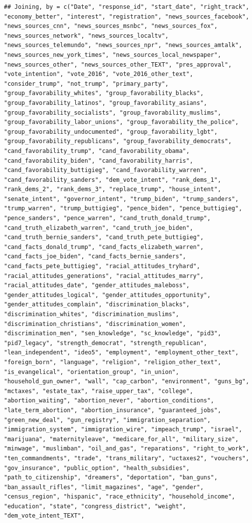 \documentclass[
]{article}
\begin{document}
\begin{verbatim}
## Joining, by = c("Date", "response_id", "start_date", "right_track", "economy_better", "interest", "registration", "news_sources_facebook", "news_sources_cnn", "news_sources_msnbc", "news_sources_fox", "news_sources_network", "news_sources_localtv", "news_sources_telemundo", "news_sources_npr", "news_sources_amtalk", "news_sources_new_york_times", "news_sources_local_newspaper", "news_sources_other", "news_sources_other_TEXT", "pres_approval", "vote_intention", "vote_2016", "vote_2016_other_text", "consider_trump", "not_trump", "primary_party", "group_favorability_whites", "group_favorability_blacks", "group_favorability_latinos", "group_favorability_asians", "group_favorability_socialists", "group_favorability_muslims", "group_favorability_labor_unions", "group_favorability_the_police", "group_favorability_undocumented", "group_favorability_lgbt", "group_favorability_republicans", "group_favorability_democrats", "cand_favorability_trump", "cand_favorability_obama", "cand_favorability_biden", "cand_favorability_harris", "cand_favorability_buttigieg", "cand_favorability_warren", "cand_favorability_sanders", "dem_vote_intent", "rank_dems_1", "rank_dems_2", "rank_dems_3", "replace_trump", "house_intent", "senate_intent", "governor_intent", "trump_biden", "trump_sanders", "trump_warren", "trump_buttigieg", "pence_biden", "pence_buttigieg", "pence_sanders", "pence_warren", "cand_truth_donald_trump", "cand_truth_elizabeth_warren", "cand_truth_joe_biden", "cand_truth_bernie_sanders", "cand_truth_pete_buttigieg", "cand_facts_donald_trump", "cand_facts_elizabeth_warren", "cand_facts_joe_biden", "cand_facts_bernie_sanders", "cand_facts_pete_buttigieg", "racial_attitudes_tryhard", "racial_attitudes_generations", "racial_attitudes_marry", "racial_attitudes_date", "gender_attitudes_maleboss", "gender_attitudes_logical", "gender_attitudes_opportunity", "gender_attitudes_complain", "discrimination_blacks", "discrimination_whites", "discrimination_muslims", "discrimination_christians", "discrimination_women", "discrimination_men", "sen_knowledge", "sc_knowledge", "pid3", "pid7_legacy", "strength_democrat", "strength_republican", "lean_independent", "ideo5", "employment", "employment_other_text", "foreign_born", "language", "religion", "religion_other_text", "is_evangelical", "orientation_group", "in_union", "household_gun_owner", "wall", "cap_carbon", "environment", "guns_bg", "mctaxes", "estate_tax", "raise_upper_tax", "college", "abortion_waiting", "abortion_never", "abortion_conditions", "late_term_abortion", "abortion_insurance", "guaranteed_jobs", "green_new_deal", "gun_registry", "immigration_separation", "immigration_system", "immigration_wire", "impeach_trump", "israel", "marijuana", "maternityleave", "medicare_for_all", "military_size", "minwage", "muslimban", "oil_and_gas", "reparations", "right_to_work", "ten_commandments", "trade", "trans_military", "uctaxes2", "vouchers", "gov_insurance", "public_option", "health_subsidies", "path_to_citizenship", "dreamers", "deportation", "ban_guns", "ban_assault_rifles", "limit_magazines", "age", "gender", "census_region", "hispanic", "race_ethnicity", "household_income", "education", "state", "congress_district", "weight", "dem_vote_intent_TEXT", 
\end{verbatim}
\end{document}
